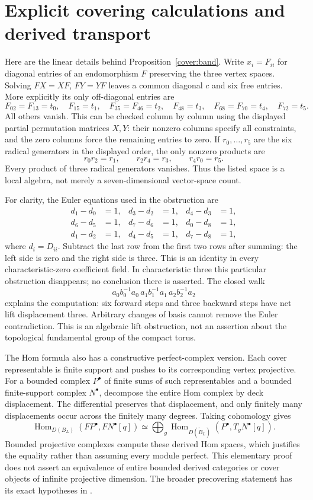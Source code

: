 \section{Explicit covering calculations and derived transport}
\label{cover:details}
Here are the linear details behind Proposition~\ref{cover:band}. Write
$x_i=F_{ii}$ for diagonal entries of an endomorphism $F$ preserving the
three vertex spaces. Solving $FX=XF$, $FY=YF$ leaves a common diagonal
$c$ and six free entries. More explicitly its only off-diagonal entries are
\[
 F_{02}=F_{13}=t_0,\quad F_{15}=t_1,\quad
 F_{35}=F_{46}=t_2,\quad F_{48}=t_3,\quad
 F_{68}=F_{70}=t_4,\quad F_{72}=t_5.
\]
All others vanish. This can be checked column by column using the displayed
partial permutation matrices $X,Y$: their nonzero columns specify all
constraints, and the zero columns force the remaining entries to zero.
If $r_0,\ldots,r_5$ are the six radical generators in the displayed order,
the only nonzero products are
\[
 r_0r_2=r_1,\qquad r_2r_4=r_3,\qquad r_4r_0=r_5.
\]
Every product of three radical generators vanishes. Thus the listed space
is a local algebra, not merely a seven-dimensional vector-space count.

For clarity, the Euler equations used in the obstruction are
\begin{align*}
 d_1-d_0&=1,&d_3-d_2&=1,&d_4-d_3&=1,\\
 d_6-d_5&=1,&d_7-d_6&=1,&d_0-d_8&=1,\\
 d_1-d_2&=1,&d_4-d_5&=1,&d_7-d_8&=1,
\end{align*}
where $d_i=D_{ii}$. Subtract the last row from the first two rows after
summing: the left side is zero and the right side is three. This is an
identity in every characteristic-zero coefficient field. In characteristic
three this particular obstruction disappears; no conclusion there is
asserted. The closed walk
\[
 a_0b_0^{-1}a_0\,a_1b_1^{-1}a_1\,a_2b_2^{-1}a_2
\]
explains the computation: six forward steps and three backward steps have
net lift displacement three. Arbitrary changes of basis cannot remove the
Euler contradiction. This is an algebraic lift obstruction, not an
assertion about the topological fundamental group of the compact torus.

The Hom formula also has a constructive perfect-complex version. Each
cover representable is finite support and pushes to its corresponding
vertex projective. For a bounded complex $P^\bullet$ of finite sums of such
representables and a bounded finite-support complex $N^\bullet$, decompose
the entire Hom complex by deck displacement. The differential preserves
that displacement, and only finitely many displacements occur across the
finitely many degrees. Taking cohomology gives
\[
 \operatorname{Hom}_{D(B_L)}(FP^\bullet,FN^\bullet[q])
 \simeq\bigoplus_g
 \operatorname{Hom}_{D(\widetilde B_L)}(P^\bullet,T_gN^\bullet[q]).
\]
Bounded projective complexes compute these derived Hom spaces, which
justifies the equality rather than assuming every module perfect. This
elementary proof does not assert an equivalence of entire bounded derived
categories or cover objects of infinite projective dimension. The broader
precovering statement has its exact hypotheses in
\cite[Theorem~4.28]{CoveringLecture2026}.

